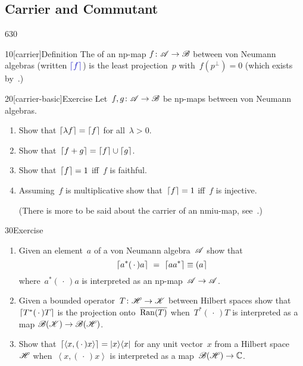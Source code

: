 \subsection{Carrier and Commutant}
\begin{parsec}{630}%
\begin{point}{10}[carrier]{Definition}%
The %
of an np-map $f\colon \mathscr{A}\to\mathscr{B}$
between von Neumann algebras
(written $\Define{\ceil{f}}$)%
is the least projection~$p$
with~$f(p^\perp)=0$
(which exists by~.)
\end{point}
\begin{point}{20}[carrier-basic]{Exercise}%
Let~$f,g\colon \mathscr{A}\to\mathscr{B}$
be np-maps between von Neumann algebras.
\begin{enumerate}
\item
Show that $\left\lceil\lambda f\right\rceil=\left\lceil f\right\rceil$
for all~$\lambda>0$.
\item
Show that~$\left\lceil f+g\right\rceil=\left\lceil f\right\rceil\cup\left\lceil g\right\rceil$.
\item
Show that~$\left\lceil f\right\rceil=1$ iff~$f$ is faithful.
\item
Assuming~$f$ is multiplicative
show that~$\left\lceil f\right\rceil=1$ iff~$f$ is injective.

(There is more to be said about
the carrier of an nmiu-map, see~.)
\end{enumerate}
\spacingfix%
\end{point}
\begin{point}{30}{Exercise}%
\begin{enumerate}
\item
Given an element~$a$ of a von Neumann algebra~$\mathscr{A}$
show that 
\begin{equation*}
\ceil{a^*(\,\cdot\,)a}\ =\ \ceil{aa^*}\equiv \ceilr{a}
\end{equation*}
where~$a^*(\,\cdot\,)a$
is interpreted as an np-map~$\mathscr{A}\to\mathscr{A}$.
\item
Given a bounded operator~$T\colon \mathscr{H}\to\mathscr{K}$
between Hilbert spaces
show that~$\left\lceil T^*(\,\cdot\,)T\right\rceil$
is the projection onto~$\overline{\operatorname{Ran}(T)}$
when~$T^*(\,\cdot\,)T$
is interpreted 
as a map
$\mathscr{B}(\mathscr{K})\to\mathscr{B}(\mathscr{H})$.
\item
Show that~$\left\lceil\left<x,(\,\cdot\,)x\right>\right\rceil=\left|x\right>\!\left<x\right|$
for any unit vector~$x$ from a Hilbert space~$\mathscr{H}$
when~$\left<x,(\,\cdot\,)x\right>$
is interpreted as a map~$\mathscr{B}(\mathscr{H})\to\mathbb{C}$.


\end{enumerate}
\end{point}
\end{parsec}
